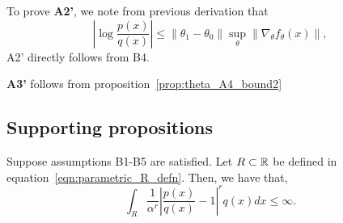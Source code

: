 \documentclass{article}
\begin{document}
To prove \textbf{A2'}, we note from previous derivation that
\[
\left | \log \frac{p(x)}{q(x)} \right | 
                \leq  \| \theta_1 - \theta_0 \| \sup_\theta \| \nabla_{\theta} f_{\theta} (x) \|,
\]
A2' directly follows from B4.

\textbf{A3'} follows from proposition~\ref{prop:theta_A4_bound2}

\subsection{Supporting propositions}


\begin{proposition}
\label{prop:theta_A3_bound}
Suppose assumptions B1-B5 are satisfied. Let $R \subset {\mathbb R}$ be defined in equation~\ref{eqn:parametric_R_defn}. Then, we have that,
\[
\int_R \frac{1}{\alpha^r} \left| \frac{p(x)}{q(x)} - 1 \right|^r q(x) dx \leq \infty.
\]
\end{proposition}
\end{document}
